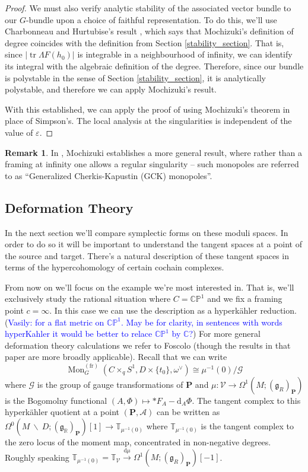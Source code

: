 \documentclass[11pt, oneside, reqno]{amsart}
\theoremstyle{definition} \newtheorem{definition}{Definition}[section]
\theoremstyle{definition} \newtheorem{remark}[definition]{Remark}
\theoremstyle{definition} \newtheorem{remarks}[definition]{Remarks}
\theoremstyle{definition} \newtheorem{question}[definition]{Question}
\theoremstyle{definition} \newtheorem*{note}{Note}
\theoremstyle{definition} \newtheorem{example}[definition]{Example}
\theoremstyle{definition} \newtheorem{examples}[definition]{Examples}
\renewcommand{\gg}{\mathfrak{g}}
\newcommand{\bb}[1]{\mathbb{#1}}
\newcommand{\mc}[1]{\mathcal{#1}}
\newcommand{\bo}[1]{\boldsymbol{#1}}
\newcommand{\bs}{\ \backslash \ }
\newcommand{\RR}{\mathbb{R}}
\newcommand{\eps}{\varepsilon}
\newcommand{\iso}{\cong}
\DeclareMathOperator{\tr}{tr}
\DeclareMathOperator{\mon}{Mon}
\renewcommand{\d}{\mathrm{d}}
\newcommand{\fr}{\mathrm{fr}}
\newcommand{\vasily}[1]{(\textcolor{blue}{Vasily: #1})}
\begin{document}
\begin{proof}
We must also verify analytic stability of the associated vector bundle to our $G$-bundle upon a choice of faithful representation.  To do this, we'll use Charbonneau and Hurtubise's result \cite[Lemma 4.5]{CharbonneauHurtubise}, which says that Mochizuki's definition of degree coincides with the definition from Section \ref{stability_section}.  That is, since $|\tr \Lambda F(h_0)|$ is integrable in a neighbourhood of infinity, we can identify its integral with the algebraic definition of the degree.  Therefore, since our bundle is polystable in the sense of Section \ref{stability_section}, it is analytically polystable, and therefore we can apply Mochizuki's result.

With this established, we can apply the proof of \cite[Proposition 5.2]{Smith} using Mochizuki's theorem in place of Simpson's.  The local analysis at the singularities is independent of the value of $\eps$.
\end{proof}

\begin{remark}
In \cite{Mochizuki}, Mochizuki establishes a more general result, where rather than a framing at infinity one allows a regular singularity -- such monopoles are referred to as ``Generalized Cherkis-Kapustin (GCK) monopoles''.
\end{remark}

\subsection{Deformation Theory} \label{def_section}
In the next section we'll compare symplectic forms on these moduli spaces.  In order to do so it will be important to understand the tangent spaces at a point of the source and target.  There's a natural description of these tangent spaces in terms of the hypercohomology of certain cochain complexes.

From now on we'll focus on the example we're most interested in.  That is, we'll exclusively study the rational situation where $C = \bb{CP}^1$ and we fix a framing point $c = \infty$.  In this case we can use the description as a hyperk\"ahler reduction.\vasily{for a flat metric on $\mathbb{CP}^1$. May be for clarity, in sentences with words hyperKahler it would be better to relace $\mathbb{CP}^1$ by $\mathbb{C}$?} For more general deformation theory calculations we refer to Foscolo \cite{FoscoloDef} (though the results in that paper are more broadly applicable).  Recall that we can write
\[\mon^{(\fr)}_G(C \times_q S^1, D \times \{t_0\}, \omega^\vee) \iso \mu^{-1}(0)/ \mc G\]
where $\mc G$ is the group of gauge transformations of $\bo P$ and $\mu \colon \mc V \to \Omega^1(M; (\gg_R)_{\bo P})$ is the Bogomolny functional $(A,\Phi) \mapsto \ast F_A - \d_A \Phi$.  The tangent complex to this hyperk\"ahler quotient at a point $(\bo P, \mc A)$ can be written as $\Omega^0(M \!\bs\! D; (\gg_\RR)_{\bo P})[1] \to \bb T_{\mu^{-1}(0)}$ where $\bb T_{\mu^{-1}(0)}$ is the tangent complex to the zero locus of the moment map, concentrated in non-negative degrees. Roughly speaking $\bb T_{\mu^{-1}(0)} = \bb T_{\mc V} \overset {\d\mu} \to \Omega^1(M; (\gg_R)_{\bo P})[-1]$.  
\end{document}
